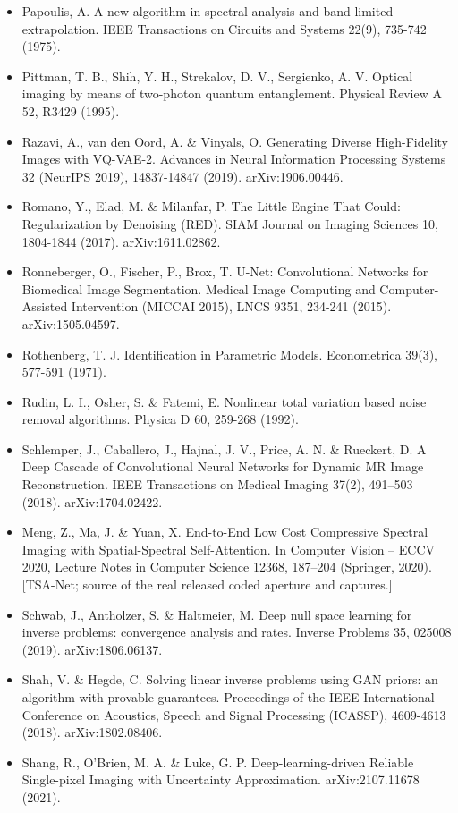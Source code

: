\documentclass[11pt]{article}
\begin{document}
\begin{itemize}
\item Papoulis, A. A new algorithm in spectral analysis and band-limited extrapolation. IEEE Transactions on Circuits and Systems 22(9), 735-742 (1975).
\item Pittman, T. B., Shih, Y. H., Strekalov, D. V., Sergienko, A. V. Optical imaging by means of two-photon quantum entanglement. Physical Review A 52, R3429 (1995).
\item Razavi, A., van den Oord, A. \& Vinyals, O. Generating Diverse High-Fidelity Images with VQ-VAE-2. Advances in Neural Information Processing Systems 32 (NeurIPS 2019), 14837-14847 (2019). arXiv:1906.00446.
\item Romano, Y., Elad, M. \& Milanfar, P. The Little Engine That Could: Regularization by Denoising (RED). SIAM Journal on Imaging Sciences 10, 1804-1844 (2017). arXiv:1611.02862.
\item Ronneberger, O., Fischer, P., Brox, T. U-Net: Convolutional Networks for Biomedical Image Segmentation. Medical Image Computing and Computer-Assisted Intervention (MICCAI 2015), LNCS 9351, 234-241 (2015). arXiv:1505.04597.
\item Rothenberg, T. J. Identification in Parametric Models. Econometrica 39(3), 577-591 (1971).
\item Rudin, L. I., Osher, S. \& Fatemi, E. Nonlinear total variation based noise removal algorithms. Physica D 60, 259-268 (1992).
\item Schlemper, J., Caballero, J., Hajnal, J. V., Price, A. N. \& Rueckert, D. A Deep Cascade of Convolutional Neural Networks for Dynamic MR Image Reconstruction. IEEE Transactions on Medical Imaging 37(2), 491--503 (2018). arXiv:1704.02422.
\item Meng, Z., Ma, J. \& Yuan, X. End-to-End Low Cost Compressive Spectral Imaging with Spatial-Spectral Self-Attention. In Computer Vision -- ECCV 2020, Lecture Notes in Computer Science 12368, 187--204 (Springer, 2020). [TSA-Net; source of the real released coded aperture and captures.]
\item Schwab, J., Antholzer, S. \& Haltmeier, M. Deep null space learning for inverse problems: convergence analysis and rates. Inverse Problems 35, 025008 (2019). arXiv:1806.06137.
\item Shah, V. \& Hegde, C. Solving linear inverse problems using GAN priors: an algorithm with provable guarantees. Proceedings of the IEEE International Conference on Acoustics, Speech and Signal Processing (ICASSP), 4609-4613 (2018). arXiv:1802.08406.
\item Shang, R., O'Brien, M. A. \& Luke, G. P. Deep-learning-driven Reliable Single-pixel Imaging with Uncertainty Approximation. arXiv:2107.11678 (2021).

\end{itemize}
\end{document}
